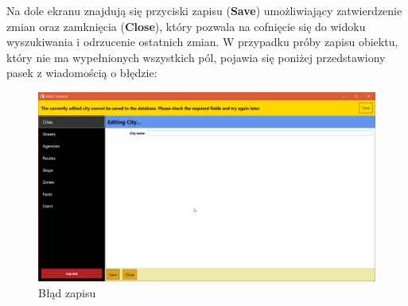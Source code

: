 \documentclass[10pt,a4paper]{article}
\begin{document}
Na dole ekranu znajdują się przyciski zapisu (\textbf{Save}) umożliwiający zatwierdzenie zmian oraz zamknięcia (\textbf{Close}), który pozwala na cofnięcie się do widoku wyszukiwania i odrzucenie ostatnich zmian. W przypadku próby zapisu obiektu, który nie ma wypełnionych wszystkich pól, pojawia się poniżej przedstawiony pasek z wiadomością o błędzie:
\begin{figure}[H]
	\centering
	\includegraphics[width=15cm]{screenshots/21_not_all_fields.png}
	\caption{Błąd zapisu}
\end{figure}
\end{document}
